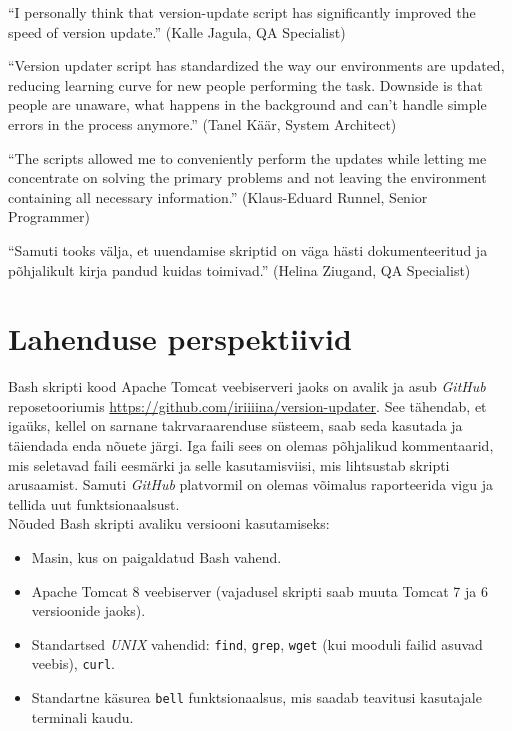 \documentclass[12pt]{report}
\newcommand{\code}[1]{\texttt{#1}}
\begin{document}
   \begin{displayquote}
   ``I personally think that version-update script has significantly improved the speed of version update.'' (Kalle Jagula, QA Specialist)
   \end{displayquote}
   
   \begin{displayquote}
    ``Version updater script has standardized the way our environments are updated, reducing learning curve for new people performing the task. Downside is that people are unaware, what happens in the background and can't handle simple errors in the process anymore.'' (Tanel Käär, System Architect)
    \end{displayquote}
    
    \begin{displayquote}
    ``The scripts allowed me to conveniently perform the updates while letting me concentrate on solving the primary problems and not leaving the environment containing all necessary information.'' (Klaus-Eduard Runnel, Senior Programmer)
    \end{displayquote}
    
    \begin{displayquote}
    ``Samuti tooks välja, et uuendamise skriptid on väga hästi dokumenteeritud ja põhjalikult kirja pandud kuidas toimivad.'' (Helina Ziugand, QA Specialist)
    \end{displayquote}

  \newpage
  
  \section{Lahenduse perspektiivid}
  
  Bash skripti kood Apache Tomcat veebiserveri jaoks on avalik ja asub \textit{GitHub} reposetooriumis \url{https://github.com/iriiiina/version-updater}. See tähendab, et igaüks, kellel on sarnane takrvaraarenduse süsteem, saab seda kasutada ja täiendada enda nõuete järgi. Iga faili sees on olemas põhjalikud kommentaarid, mis seletavad faili eesmärki ja selle kasutamisviisi, mis lihtsustab skripti arusaamist. Samuti \textit{GitHub} platvormil on olemas võimalus raporteerida vigu ja tellida uut funktsionaalsust.\\
  
  Nõuded Bash skripti avaliku versiooni kasutamiseks:
  \begin{itemize}
    \item Masin, kus on paigaldatud Bash vahend.
    \item Apache Tomcat 8 veebiserver (vajadusel skripti saab muuta Tomcat 7 ja 6 versioonide jaoks).
    \item Standartsed \textit{UNIX} vahendid: \code{find}, \code{grep}, \code{wget} (kui mooduli failid asuvad veebis), \code{curl}.
    \item Standartne käsurea \code{bell} funktsionaalsus, mis saadab teavitusi kasutajale terminali kaudu.
  \end{itemize}\\
  
\end{document}
